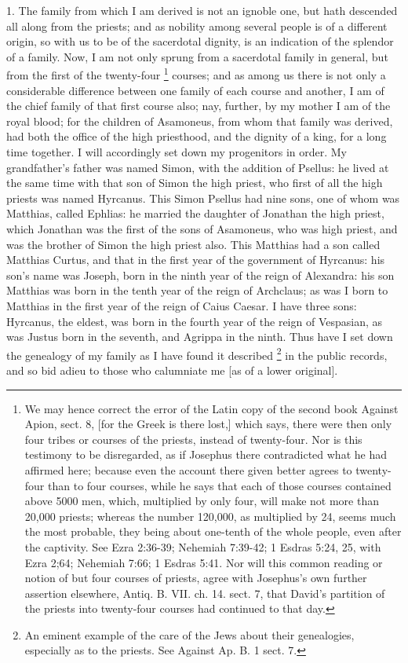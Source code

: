 
1. The family from which I am derived is not an ignoble one, but hath
descended all along from the priests; and as nobility among several people
is of a different origin, so with us to be of the sacerdotal dignity, is
an indication of the splendor of a family. Now, I am not only sprung from
a sacerdotal family in general, but from the first of the twenty-four \footnote{We may hence correct the
error of the Latin copy of the second book Against Apion, sect. 8, [for
the Greek is there lost,] which says, there were then only four tribes or
courses of the priests, instead of twenty-four. Nor is this testimony to
be disregarded, as if Josephus there contradicted what he had affirmed
here; because even the account there given better agrees to twenty-four
than to four courses, while he says that each of those courses contained
above 5000 men, which, multiplied by only four, will make not more than
20,000 priests; whereas the number 120,000, as multiplied by 24, seems
much the most probable, they being about one-tenth of the whole people,
even after the captivity. See Ezra 2:36-39; Nehemiah 7:39-42; 1 Esdras
5:24, 25, with Ezra 2;64; Nehemiah 7:66; 1 Esdras 5:41. Nor will this
common reading or notion of but four courses of priests, agree with
Josephus's own further assertion elsewhere, Antiq. B. VII. ch. 14. sect.
7, that David's partition of the priests into twenty-four courses had
continued to that day.}
courses; and as among us there is not only a considerable difference
between one family of each course and another, I am of the chief family of
that first course also; nay, further, by my mother I am of the royal
blood; for the children of Asamoneus, from whom that family was derived,
had both the office of the high priesthood, and the dignity of a king, for
a long time together. I will accordingly set down my progenitors in order.
My grandfather's father was named Simon, with the addition of Psellus: he
lived at the same time with that son of Simon the high priest, who first
of all the high priests was named Hyrcanus. This Simon Psellus had nine
sons, one of whom was Matthias, called Ephlias: he married the daughter of
Jonathan the high priest, which Jonathan was the first of the sons of
Asamoneus, who was high priest, and was the brother of Simon the high
priest also. This Matthias had a son called Matthias Curtus, and that in
the first year of the government of Hyrcanus: his son's name was Joseph,
born in the ninth year of the reign of Alexandra: his son Matthias was
born in the tenth year of the reign of Archclaus; as was I born to
Matthias in the first year of the reign of Caius Caesar. I have three
sons: Hyrcanus, the eldest, was born in the fourth year of the reign of
Vespasian, as was Justus born in the seventh, and Agrippa in the ninth.
Thus have I set down the genealogy of my family as I have found it
described \footnote{An eminent example of the
care of the Jews about their genealogies, especially as to the priests.
See Against Ap. B. 1 sect. 7.}
in the public records, and so bid adieu to those who calumniate me [as of
a lower original].

